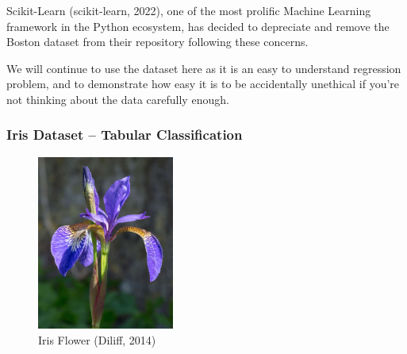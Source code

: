 \documentclass[10pt]{beamer}
\begin{document}
Scikit-Learn (scikit-learn, 2022), one of the most prolific Machine Learning framework in the Python
ecosystem, has decided to depreciate and remove the Boston dataset from their
repository following these concerns.

We will continue to use the dataset here as it is an easy to understand regression
problem, and to demonstrate how easy it is to be accidentally unethical if you're not
thinking about the data carefully enough. 

\subsubsection*{Iris Dataset -- Tabular Classification}
\label{sec:orgfa87ef1}

\begin{figure}[htbp]
\centering
\includegraphics[width=0.4\textwidth]{images/iris.jpg}
\caption{Iris Flower (Diliff, 2014)}
\end{figure}
\end{document}
